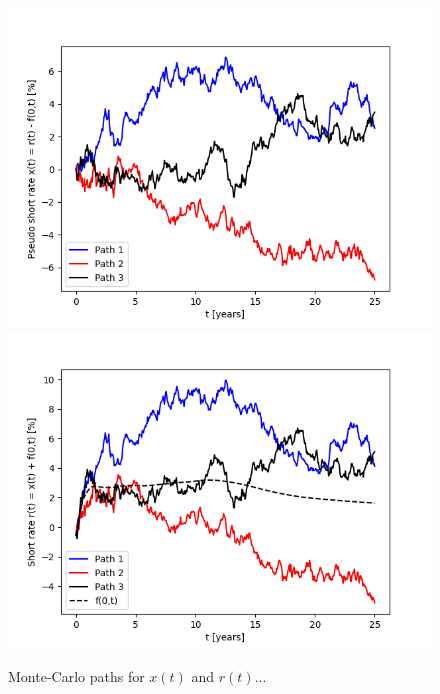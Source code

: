 \documentclass{report}
\begin{document}
\begin{figure}
\centering
\includegraphics[scale=0.7]{figures/pseudo_short_rate_paths.png}
\includegraphics[scale=0.7]{figures/short_rate_paths.png}
\caption{Monte-Carlo paths for $x(t)$ and $r(t)$...}
\end{figure}
\end{document}
